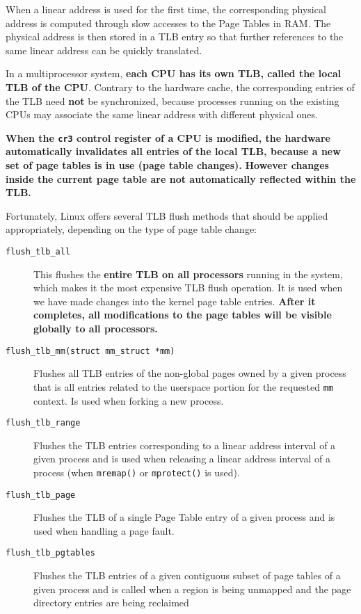 \documentclass[10pt,a4paper]{article}
\begin{document}
When a linear address is used for the first time, the corresponding physical address is computed through slow accesses to the Page Tables in RAM. The physical address is then stored in a TLB entry so that further references to the same linear address can be quickly translated.

In a multiprocessor system, \textbf{each CPU has its own TLB, called the \textbf{local TLB} of the CPU}. Contrary to the hardware cache, the corresponding entries of the TLB need \textbf{not} be synchronized, because processes running on the existing CPUs may associate the same linear address with different physical ones.

\textbf{When the \texttt{cr3} control register of a CPU is modified, the hardware automatically invalidates all entries of the local TLB, because a new set of page tables is in use (page table changes).} \textbf{However changes inside the current page table are not automatically reflected within the TLB.}

Fortunately, Linux offers several TLB flush methods that should be applied appropriately, depending on the type of page table change:
\begin{description}
\item[\texttt{flush\_tlb\_all}] This flushes the \textbf{entire TLB on all processors} running in the system, which makes it the most expensive TLB flush operation. It is used when we have made changes into the kernel page table entries. \textbf{After it completes, all modifications to the page tables will be visible globally to all processors.}

\item[\texttt{flush\_tlb\_mm(struct mm\_struct *mm)}] Flushes all TLB entries of the non-global pages owned by a given process that is all entries related to the userspace portion for the requested \texttt{mm} context. Is used when forking a new process.

\item[\texttt{flush\_tlb\_range}] Flushes the TLB entries corresponding to a linear address interval of a given process and is used when releasing a linear address interval of a process (when \texttt{mremap()} or \texttt{mprotect()} is used).

\item[\texttt{flush\_tlb\_page}] Flushes the TLB of a single Page Table entry of a given process and is used when handling a page fault.

\item[\texttt{flush\_tlb\_pgtables}] Flushes the TLB entries of a given contiguous subset of page tables of a given process and is called when a region is being unmapped and the page directory entries are being reclaimed 
\end{description}
\end{document}
